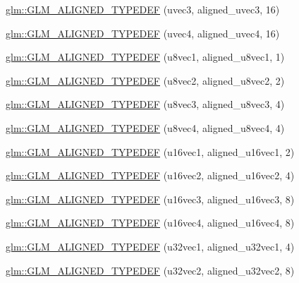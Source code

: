 \begin{DoxyCompactItemize}
\item 
\hyperlink{group__gtx__type__aligned_ga5cec574686a7f3c8ed24bb195c5e2d0a}{glm\+::\+G\+L\+M\+\_\+\+A\+L\+I\+G\+N\+E\+D\+\_\+\+T\+Y\+P\+E\+D\+E\+F} (uvec3, aligned\+\_\+uvec3, 16)
\item 
\hyperlink{group__gtx__type__aligned_ga47edfdcee9c89b1ebdaf20450323b1d4}{glm\+::\+G\+L\+M\+\_\+\+A\+L\+I\+G\+N\+E\+D\+\_\+\+T\+Y\+P\+E\+D\+E\+F} (uvec4, aligned\+\_\+uvec4, 16)
\item 
\hyperlink{group__gtx__type__aligned_ga5611d6718e3a00096918a64192e73a45}{glm\+::\+G\+L\+M\+\_\+\+A\+L\+I\+G\+N\+E\+D\+\_\+\+T\+Y\+P\+E\+D\+E\+F} (u8vec1, aligned\+\_\+u8vec1, 1)
\item 
\hyperlink{group__gtx__type__aligned_ga19837e6f72b60d994a805ef564c6c326}{glm\+::\+G\+L\+M\+\_\+\+A\+L\+I\+G\+N\+E\+D\+\_\+\+T\+Y\+P\+E\+D\+E\+F} (u8vec2, aligned\+\_\+u8vec2, 2)
\item 
\hyperlink{group__gtx__type__aligned_ga9740cf8e34f068049b42a2753f9601c2}{glm\+::\+G\+L\+M\+\_\+\+A\+L\+I\+G\+N\+E\+D\+\_\+\+T\+Y\+P\+E\+D\+E\+F} (u8vec3, aligned\+\_\+u8vec3, 4)
\item 
\hyperlink{group__gtx__type__aligned_ga8b8588bb221448f5541a858903822a57}{glm\+::\+G\+L\+M\+\_\+\+A\+L\+I\+G\+N\+E\+D\+\_\+\+T\+Y\+P\+E\+D\+E\+F} (u8vec4, aligned\+\_\+u8vec4, 4)
\item 
\hyperlink{group__gtx__type__aligned_ga991abe990c16de26b2129d6bc2f4c051}{glm\+::\+G\+L\+M\+\_\+\+A\+L\+I\+G\+N\+E\+D\+\_\+\+T\+Y\+P\+E\+D\+E\+F} (u16vec1, aligned\+\_\+u16vec1, 2)
\item 
\hyperlink{group__gtx__type__aligned_gac01bb9fc32a1cd76c2b80d030f71df4c}{glm\+::\+G\+L\+M\+\_\+\+A\+L\+I\+G\+N\+E\+D\+\_\+\+T\+Y\+P\+E\+D\+E\+F} (u16vec2, aligned\+\_\+u16vec2, 4)
\item 
\hyperlink{group__gtx__type__aligned_ga09540dbca093793a36a8997e0d4bee77}{glm\+::\+G\+L\+M\+\_\+\+A\+L\+I\+G\+N\+E\+D\+\_\+\+T\+Y\+P\+E\+D\+E\+F} (u16vec3, aligned\+\_\+u16vec3, 8)
\item 
\hyperlink{group__gtx__type__aligned_gaecafb5996f5a44f57e34d29c8670741e}{glm\+::\+G\+L\+M\+\_\+\+A\+L\+I\+G\+N\+E\+D\+\_\+\+T\+Y\+P\+E\+D\+E\+F} (u16vec4, aligned\+\_\+u16vec4, 8)
\item 
\hyperlink{group__gtx__type__aligned_gac6b161a04d2f8408fe1c9d857e8daac0}{glm\+::\+G\+L\+M\+\_\+\+A\+L\+I\+G\+N\+E\+D\+\_\+\+T\+Y\+P\+E\+D\+E\+F} (u32vec1, aligned\+\_\+u32vec1, 4)
\item 
\hyperlink{group__gtx__type__aligned_ga1fa0dfc8feb0fa17dab2acd43e05342b}{glm\+::\+G\+L\+M\+\_\+\+A\+L\+I\+G\+N\+E\+D\+\_\+\+T\+Y\+P\+E\+D\+E\+F} (u32vec2, aligned\+\_\+u32vec2, 8)

\end{DoxyCompactItemize}
